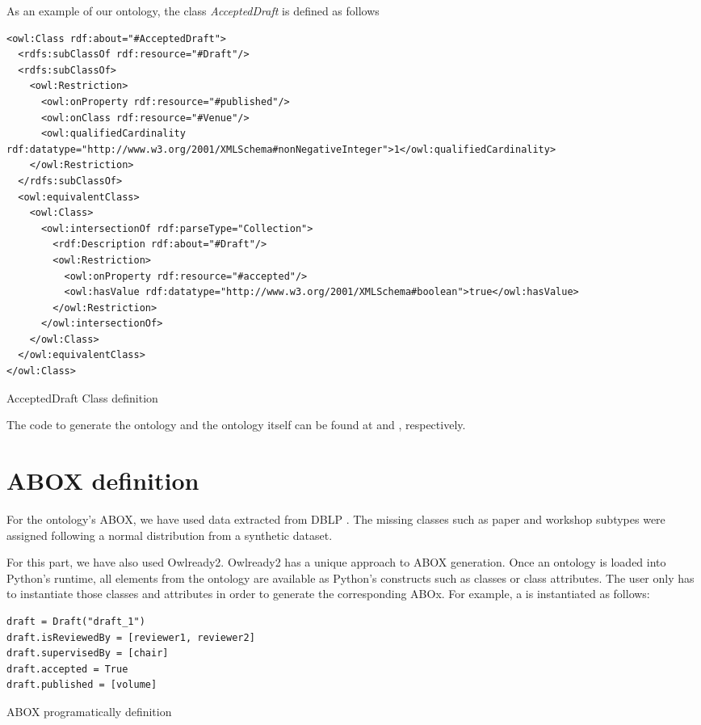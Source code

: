 \documentclass[12pt, a4paper]{article}
\begin{document}
\pagebreak

As an example of our ontology, the class \textit{AcceptedDraft} is defined as follows

\begin{listing}[H]
  \begin{verbatim}
<owl:Class rdf:about="#AcceptedDraft">
  <rdfs:subClassOf rdf:resource="#Draft"/>
  <rdfs:subClassOf>
    <owl:Restriction>
      <owl:onProperty rdf:resource="#published"/>
      <owl:onClass rdf:resource="#Venue"/>
      <owl:qualifiedCardinality rdf:datatype="http://www.w3.org/2001/XMLSchema#nonNegativeInteger">1</owl:qualifiedCardinality>
    </owl:Restriction>
  </rdfs:subClassOf>
  <owl:equivalentClass>
    <owl:Class>
      <owl:intersectionOf rdf:parseType="Collection">
        <rdf:Description rdf:about="#Draft"/>
        <owl:Restriction>
          <owl:onProperty rdf:resource="#accepted"/>
          <owl:hasValue rdf:datatype="http://www.w3.org/2001/XMLSchema#boolean">true</owl:hasValue>
        </owl:Restriction>
      </owl:intersectionOf>
    </owl:Class>
  </owl:equivalentClass>
</owl:Class>
  \end{verbatim}
  \caption{AcceptedDraft Class definition}
  \label{lst:draft}
\end{listing}

The code to generate the ontology and the ontology itself can be found at  and , respectively.

\section{ABOX definition}\label{sec:abox}

For the ontology's ABOX, we have used data extracted from DBLP \cite{DBLP}. The missing classes such as paper and workshop subtypes were assigned following a normal distribution from a synthetic dataset.

For this part, we have also used Owlready2. Owlready2 has a unique approach to ABOX generation. Once an ontology is loaded into Python's runtime, all elements from the ontology are available as Python's constructs such as classes or class attributes. The user only has to instantiate those classes and attributes in order to generate the corresponding ABOx. For example, a  is instantiated as follows:

\begin{listing}[H]
  \begin{verbatim}
draft = Draft("draft_1")
draft.isReviewedBy = [reviewer1, reviewer2]
draft.supervisedBy = [chair]
draft.accepted = True
draft.published = [volume]
  \end{verbatim}
  \caption{ABOX programatically definition}
  \label{lst:draft}
\end{listing}
\end{document}
